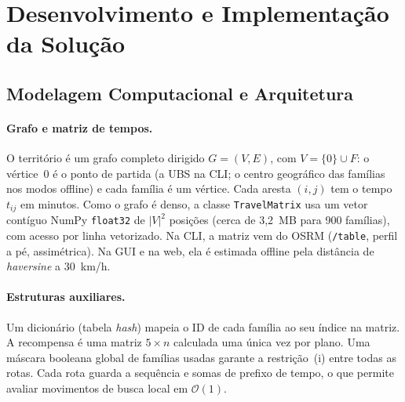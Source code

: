 \documentclass[11pt,a4paper]{article}
\begin{document}
\section{Desenvolvimento e Implementação da Solução}

\subsection{Modelagem Computacional e Arquitetura}

\paragraph{Grafo e matriz de tempos.} O território é um grafo completo dirigido $G=(V,E)$, com $V = \{0\} \cup F$: o vértice~0 é o ponto de partida (a UBS na CLI; o centro geográfico das famílias nos modos offline) e cada família é um vértice. Cada aresta $(i,j)$ tem o tempo $t_{ij}$ em minutos. Como o grafo é denso, a classe \texttt{TravelMatrix} usa um vetor contíguo NumPy \texttt{float32} de $|V|^2$ posições (cerca de 3,2~MB para 900 famílias), com acesso por linha vetorizado. Na CLI, a matriz vem do OSRM (\texttt{/table}, perfil a pé, assimétrica). Na GUI e na web, ela é estimada offline pela distância de \emph{haversine} a 30~km/h.

\paragraph{Estruturas auxiliares.} Um dicionário (tabela \emph{hash}) mapeia o ID de cada família ao seu índice na matriz. A recompensa é uma matriz $5 \times n$ calculada uma única vez por plano. Uma máscara booleana global de famílias usadas garante a restrição~(i) entre todas as rotas. Cada rota guarda a sequência e somas de prefixo de tempo, o que permite avaliar movimentos de busca local em $\mathcal{O}(1)$.
\end{document}
